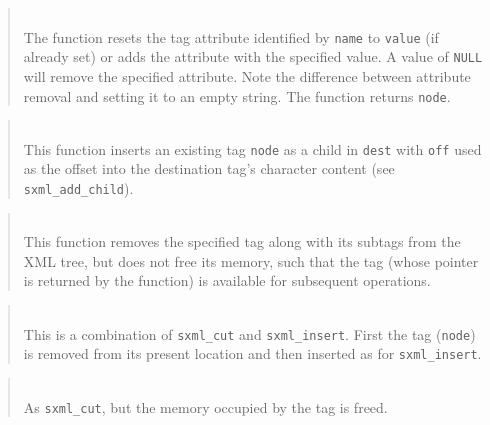\begin{quote}
\noindent\hspace{-0.35in}{\tt sxml\_t sxml\_set\_attr[\_d] (sxml\_t node, const char *name, const char *value); }\\ \hspace{0in}
The function resets the tag attribute identified by {\tt name} to
{\tt value} (if already set)
or adds the attribute with the specified value.
A value of {\tt NULL} will remove the specified attribute.
Note the difference between attribute removal and setting it to an empty
string.
The function returns {\tt node}.
\end{quote}

\begin{quote}
\noindent\hspace{-0.35in}{\tt sxml\_t sxml\_insert (sxml\_t node, sxml\_t dest, size\_t off); }\\ \hspace{0in}
This function inserts an existing tag {\tt node} as a child in {\tt dest} with
{\tt off} used as the offset into the destination tag's character content
(see {\tt sxml\_add\_child}).
\end{quote}

\begin{quote}
\noindent\hspace{-0.35in}{\tt sxml\_t sxml\_cut (sxml\_t node); }\\ \hspace{0in}
This function removes the specified tag along with its subtags from the
XML tree, but does not free its memory, such that the tag (whose pointer is
returned by the function) is available for subsequent operations.
\end{quote}

\begin{quote}
\noindent\hspace{-0.35in}{\tt sxml\_t sxml\_move (sxml\_t node, sxml\_t dest, size\_t off); }\\ \hspace{0in}
This is a combination of {\tt sxml\_cut} and {\tt sxml\_insert}.
First the tag ({\tt node})
is removed from its present location and then inserted as
for {\tt sxml\_insert}.
\end{quote}

\begin{quote}
\noindent\hspace{-0.35in}{\tt void sxml\_remove (sxml\_t node); }\\ \hspace{0in}
As {\tt sxml\_cut}, but the memory occupied by the tag is freed.
\end{quote}

